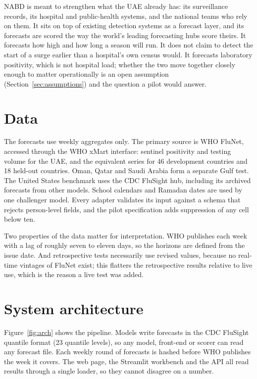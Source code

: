 \documentclass[11pt,a4paper]{article}
\begin{document}
NABD is meant to strengthen what the UAE already has: its surveillance records, its hospital and public-health systems, and the national teams who rely on them. It sits on top of existing detection systems as a forecast layer, and its forecasts are scored the way the world's leading forecasting hubs score theirs. It forecasts how high and how long a season will run. It does not claim to detect the start of a surge earlier than a hospital's own census would. It forecasts laboratory positivity, which is not hospital load; whether the two move together closely enough to matter operationally is an open assumption (Section~\ref{sec:assumptions}) and the question a pilot would answer.

\section{Data}

The forecasts use weekly aggregates only. The primary source is WHO FluNet, accessed through the WHO xMart interface: sentinel positivity and testing volume for the UAE, and the equivalent series for 46 development countries and 18 held-out countries. Oman, Qatar and Saudi Arabia form a separate Gulf test. The United States benchmark uses the CDC FluSight hub, including its archived forecasts from other models. School calendars and Ramadan dates are used by one challenger model. Every adapter validates its input against a schema that rejects person-level fields, and the pilot specification adds suppression of any cell below ten.

Two properties of the data matter for interpretation. WHO publishes each week with a lag of roughly seven to eleven days, so the horizons are defined from the issue date. And retrospective tests necessarily use revised values, because no real-time vintages of FluNet exist; this flatters the retrospective results relative to live use, which is the reason a live test was added.

\section{System architecture}

Figure~\ref{fig:arch} shows the pipeline. Models write forecasts in the CDC FluSight quantile format (23 quantile levels), so any model, front-end or scorer can read any forecast file. Each weekly round of forecasts is hashed before WHO publishes the week it covers. The web page, the Streamlit workbench and the API all read results through a single loader, so they cannot disagree on a number.
\end{document}
